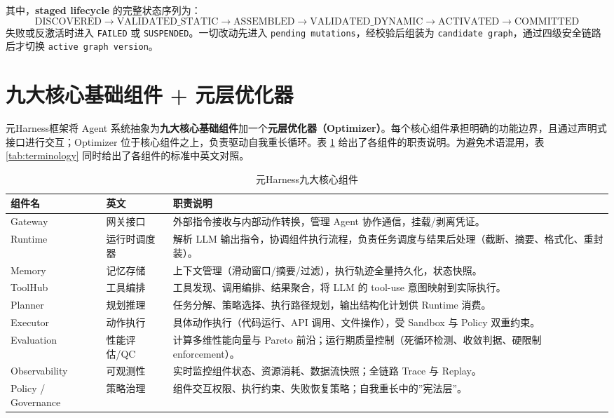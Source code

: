 其中，\textbf{staged lifecycle} 的完整状态序列为：
\[
\text{DISCOVERED} \to \text{VALIDATED\_STATIC} \to \text{ASSEMBLED} \to \text{VALIDATED\_DYNAMIC} \to \text{ACTIVATED} \to \text{COMMITTED}
\]
失败或反激活时进入 \texttt{FAILED} 或 \texttt{SUSPENDED}。一切改动先进入 \texttt{pending mutations}，经校验后组装为 \texttt{candidate graph}，通过四级安全链路后才切换 \texttt{active graph version}。

\section{九大核心基础组件 + 元层优化器}

元Harness框架将 Agent 系统抽象为\textbf{九大核心基础组件}加一个\textbf{元层优化器（Optimizer）}。每个核心组件承担明确的功能边界，且通过声明式接口进行交互；Optimizer 位于核心组件之上，负责驱动自我重长循环。表 \ref{tab:components} 给出了各组件的职责说明。为避免术语混用，表 \ref{tab:terminology} 同时给出了各组件的标准中英文对照。

\begin{table}[htbp]
\centering
\caption{元Harness九大核心组件}
\label{tab:components}
\begin{tabular}{@{}llp{8cm}@{}}
\toprule
\textbf{组件名} & \textbf{英文} & \textbf{职责说明} \\
\midrule
Gateway & 网关接口 & 外部指令接收与内部动作转换，管理 Agent 协作通信，挂载/剥离凭证。 \\
Runtime & 运行时调度器 & 解析 LLM 输出指令，协调组件执行流程，负责任务调度与结果后处理（截断、摘要、格式化、重封装）。 \\
Memory & 记忆存储 & 上下文管理（滑动窗口/摘要/过滤），执行轨迹全量持久化，状态快照。 \\
ToolHub & 工具编排 & 工具发现、调用编排、结果聚合，将 LLM 的 tool-use 意图映射到实际执行。 \\
Planner & 规划推理 & 任务分解、策略选择、执行路径规划，输出结构化计划供 Runtime 消费。 \\
Executor & 动作执行 & 具体动作执行（代码运行、API 调用、文件操作），受 Sandbox 与 Policy 双重约束。 \\
Evaluation & 性能评估/QC & 计算多维性能向量与 Pareto 前沿；运行期质量控制（死循环检测、收敛判据、硬限制 enforcement）。 \\
Observability & 可观测性 & 实时监控组件状态、资源消耗、数据流快照；全链路 Trace 与 Replay。 \\
Policy / Governance & 策略治理 & 组件交互权限、执行约束、失败恢复策略；自我重长中的”宪法层”。 \\
\bottomrule
\end{tabular}
\end{table}

